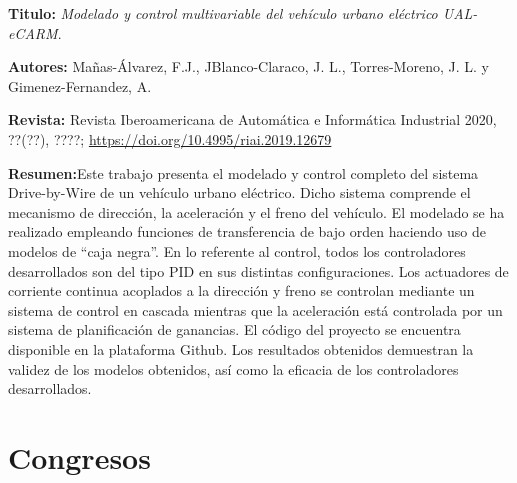 \textbf{Titulo:} \textit{Modelado y control multivariable del vehículo urbano eléctrico UAL-eCARM}\cite{manas2020byWire}.

\textbf{Autores:} Mañas-Álvarez, F.J., JBlanco-Claraco, J. L., Torres-Moreno, J. L. y Gimenez-Fernandez, A.

\textbf{Revista:} Revista Iberoamericana de Automática e Informática Industrial 2020, ??(??), ????; \url{https://doi.org/10.4995/riai.2019.12679}

\textbf{Resumen:}Este trabajo presenta el modelado y control completo del sistema Drive-by-Wire de un vehículo urbano eléctrico. Dicho sistema comprende el mecanismo de dirección, la aceleración y el freno del vehículo. El modelado se ha realizado empleando funciones de transferencia de bajo orden haciendo uso de modelos de “caja negra”. En lo referente al control, todos los controladores desarrollados son del tipo PID en sus distintas configuraciones. Los actuadores de corriente continua acoplados a la dirección y freno se controlan mediante un sistema de control en cascada mientras que la aceleración está controlada por un sistema de planificación de ganancias. El código del proyecto se encuentra disponible en la plataforma Github. Los resultados obtenidos demuestran la validez de los modelos obtenidos, así como la eficacia de los controladores desarrollados.

\section{Congresos}